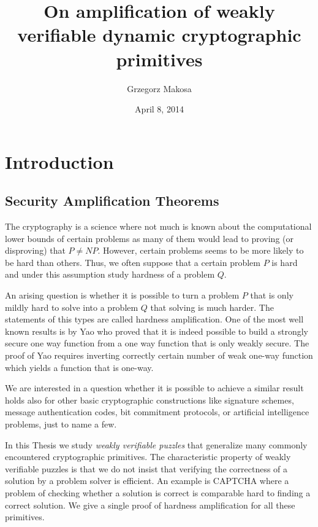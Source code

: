\documentclass[11pt,a4paper,titlepage]{memoir}
\title{On amplification of weakly verifiable dynamic cryptographic primitives}
\author{Grzegorz Makosa}
\date{April 8, 2014}
\begin{document}
\frontmatter

%

\cleartorecto
\tableofcontents
\mainmatter

\chapter{Introduction}
\section{Security Amplification Theorems}
The cryptography is a science where not much is known about the computational lower bounds of certain problems
as many of them would lead to proving (or disproving) that $P \neq NP$.
However, certain problems seems to be more likely to be hard than others.
Thus, we often suppose that a certain problem $P$ is hard and under this assumption
study hardness of a problem $Q$.

An arising question is whether it is possible to turn a problem $P$ that is only mildly hard to solve into a problem $Q$
that solving is much harder. The statements of this types are called hardness amplification.
One of the most well known results is by Yao who proved that it is indeed possible to build a strongly secure one way function
from a one way function that is only weakly secure. The proof of Yao requires inverting correctly certain number of weak one-way function
which yields a function that is one-way.

We are interested in a question whether it is possible to achieve a similar result holds also for other basic cryptographic constructions
like signature schemes, message authentication codes, bit commitment protocols, or artificial intelligence problems, just to name a few.

In this Thesis we study \textit{weakly verifiable puzzles} that generalize many commonly encountered cryptographic primitives.
The characteristic property of weakly verifiable puzzles is that we do not insist that verifying the correctness of a solution by a problem
solver is efficient. An example is CAPTCHA where a problem of checking whether a solution is correct is comparable hard to finding a correct solution.
We give a single proof of hardness amplification for all these primitives.
\end{document}
